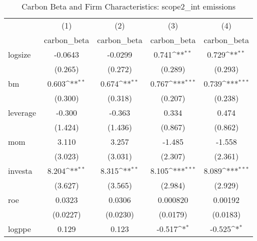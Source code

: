 \begin{table}[htbp]\centering
\def\sym#1{\ifmmode^{#1}\else\(^{#1}\)\fi}
\caption{Carbon Beta and Firm Characteristics: scope2\_int emissions}
\begin{tabular}{l*{4}{c}}
\hline\hline
                    &\multicolumn{1}{c}{(1)}&\multicolumn{1}{c}{(2)}&\multicolumn{1}{c}{(3)}&\multicolumn{1}{c}{(4)}\\
                    &\multicolumn{1}{c}{carbon\_beta}&\multicolumn{1}{c}{carbon\_beta}&\multicolumn{1}{c}{carbon\_beta}&\multicolumn{1}{c}{carbon\_beta}\\
\hline
logsize             &     -0.0643         &     -0.0299         &       0.741\sym{**} &       0.729\sym{**} \\
                    &     (0.265)         &     (0.272)         &     (0.289)         &     (0.293)         \\
[1em]
bm                  &       0.603\sym{**} &       0.674\sym{**} &       0.767\sym{***}&       0.739\sym{***}\\
                    &     (0.300)         &     (0.318)         &     (0.207)         &     (0.238)         \\
[1em]
leverage            &      -0.300         &      -0.363         &       0.334         &       0.474         \\
                    &     (1.424)         &     (1.436)         &     (0.867)         &     (0.862)         \\
[1em]
mom                 &       3.110         &       3.257         &      -1.485         &      -1.558         \\
                    &     (3.023)         &     (3.031)         &     (2.307)         &     (2.361)         \\
[1em]
investa             &       8.204\sym{**} &       8.315\sym{**} &       8.105\sym{***}&       8.089\sym{***}\\
                    &     (3.627)         &     (3.565)         &     (2.984)         &     (2.929)         \\
[1em]
roe                 &      0.0323         &      0.0306         &    0.000820         &     0.00192         \\
                    &    (0.0227)         &    (0.0230)         &    (0.0179)         &    (0.0183)         \\
[1em]
logppe              &       0.129         &       0.123         &      -0.517\sym{*}  &      -0.525\sym{*}  \\

\end{tabular}
\end{table}
